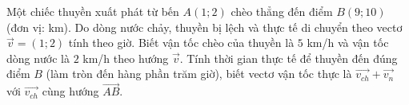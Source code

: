 \begin{bt}%
	Một chiếc thuyền xuất phát từ bến $A(1;2)$ chèo thẳng đến điểm $B(9;10)$ (đơn vị: km). Do dòng nước chảy, thuyền bị lệch và thực tế di chuyển theo vectơ $\overrightarrow{v}=(1;2)$ tính theo giờ. Biết vận tốc chèo của thuyền là $5$ km/h và vận tốc dòng nước là $2$ km/h theo hướng $\overrightarrow{v}$. Tính thời gian thực tế để thuyền đến đúng điểm $B$ (làm tròn đến hàng phần trăm giờ), biết vectơ vận tốc thực là $\overrightarrow{v_{ch}}+\overrightarrow{v_n}$ với $\overrightarrow{v_{ch}}$ cùng hướng $\overrightarrow{AB}$.
	
\end{bt}

